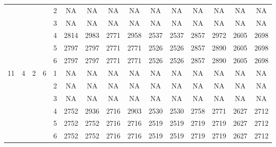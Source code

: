 \begin{longtable}{|c|c|c|c|c|c c|c c|c c|c c|c c|}
 & & & & 2 & NA & NA & NA & NA & NA & NA & NA & NA & NA & NA \\
 & & & & 3 & NA & NA & NA & NA & NA & NA & NA & NA & NA & NA \\
 & & & & 4 & 2814 & 2983 & 2771 & 2958 & 2537 & 2537 & 2857 & 2972 & 2605 & 2698 \\
 & & & & 5 & 2797 & 2797 & 2771 & 2771 & 2526 & 2526 & 2857 & 2890 & 2605 & 2698 \\
 & & & & 6 & 2797 & 2797 & 2771 & 2771 & 2526 & 2526 & 2857 & 2890 & 2605 & 2698 \\
\hline
\multirow{6}{*}{11} & \multirow{6}{*}{4} & \multirow{6}{*}{2} & \multirow{6}{*}{6} & 1 & NA & NA & NA & NA & NA & NA & NA & NA & NA & NA \\
 & & & & 2 & NA & NA & NA & NA & NA & NA & NA & NA & NA & NA \\
 & & & & 3 & NA & NA & NA & NA & NA & NA & NA & NA & NA & NA \\
 & & & & 4 & 2752 & 2936 & 2716 & 2903 & 2530 & 2530 & 2758 & 2771 & 2627 & 2712 \\
 & & & & 5 & 2752 & 2752 & 2716 & 2716 & 2519 & 2519 & 2719 & 2719 & 2627 & 2712 \\
 & & & & 6 & 2752 & 2752 & 2716 & 2716 & 2519 & 2519 & 2719 & 2719 & 2627 & 2712 \\
\hline
\end{longtable}